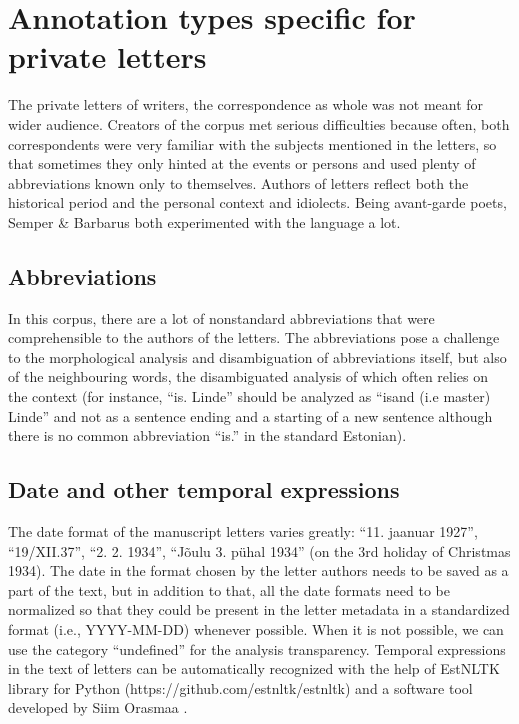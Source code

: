 \documentclass[runningheads]{llncs}
\begin{document}
\section{Annotation types specific for private letters}

The private letters of writers, the correspondence as whole was not meant for wider audience. Creators of the corpus met serious difficulties because often, both correspondents were very familiar with the subjects mentioned in the letters, so that sometimes they only hinted at the events or persons and used plenty of abbreviations known only to themselves. Authors of letters reflect both the historical period and the personal context and idiolects. Being avant-garde poets, Semper \& Barbarus both experimented with the language a lot. 

\subsection{Abbreviations}

In this corpus, there are a lot of nonstandard abbreviations that were comprehensible to the authors of the letters. The abbreviations pose a challenge to the morphological analysis and disambiguation of abbreviations itself, but also of the neighbouring words, the disambiguated analysis of which often relies on the context (for instance, “is. Linde” should be analyzed as “isand (i.e master) Linde” and not as a sentence ending and a starting of a new sentence although there is no common abbreviation “is.” in the standard Estonian). 

\subsection{Date and other temporal expressions}

The date format of the manuscript letters varies greatly: ``11. jaanuar 1927'', ``19/XII.37'', ``2. 2. 1934'', ``J\~oulu 3. p\"uhal 1934'' (on the 3rd holiday of Christmas 1934). The date in the format chosen by the letter authors needs to be saved as a part of the text, but in addition to that, all the date formats need to be normalized so that they could be present in the letter metadata in a standardized format (i.e., YYYY-MM-DD) whenever possible. When it is not possible, we can use the category “undefined” for the analysis transparency. Temporal expressions in the text of letters can be automatically recognized with the help of EstNLTK library for Python (https://github.com/estnltk/estnltk) and a software tool developed by Siim Orasmaa \cite{ORASMAA14.530}. 
\end{document}
